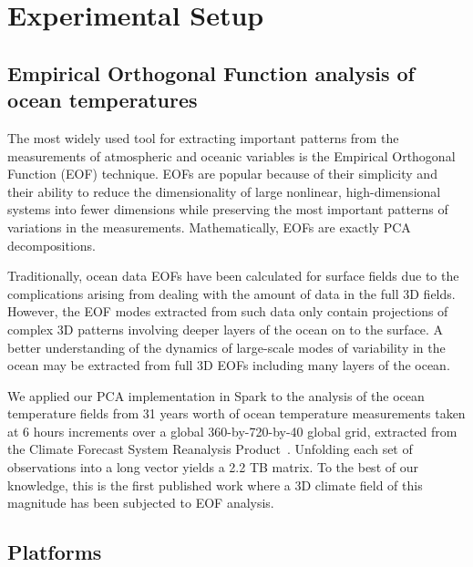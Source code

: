 \section{Experimental Setup}
\label{sec:setup}

\subsection{Empirical Orthogonal Function analysis of ocean temperatures}
The most widely used tool for extracting important patterns from the
measurements of atmospheric and oceanic variables is the Empirical Orthogonal
Function (EOF) technique. EOFs are popular because of their simplicity and
their ability to reduce the dimensionality of large nonlinear, high-dimensional
systems into fewer dimensions while preserving the most important patterns of
variations in the measurements. Mathematically, EOFs are exactly PCA decompositions.

Traditionally, ocean data EOFs have been calculated for surface fields due to
the complications arising from dealing with the amount of data in the full 3D fields. 
However, the EOF modes extracted from such data only
contain projections of complex 3D patterns involving deeper layers of the
ocean on to the surface. A better understanding of the dynamics of large-scale
modes of variability in the ocean may be extracted from full 3D EOFs including
many layers of the ocean. 

We applied our PCA implementation in Spark to the analysis of the ocean
temperature fields from 31 years worth of ocean temperature measurements taken
at 6 hours increments over a global 360-by-720-by-40 global grid, extracted
from the Climate Forecast System Reanalysis Product~\cite{Saha:2010ji}.
Unfolding each set of observations into a long vector yields a 2.2 TB matrix.
To the best of our knowledge, this is the first published work where a 3D
climate field of this magnitude has been subjected to EOF analysis.

\subsection{Platforms}

